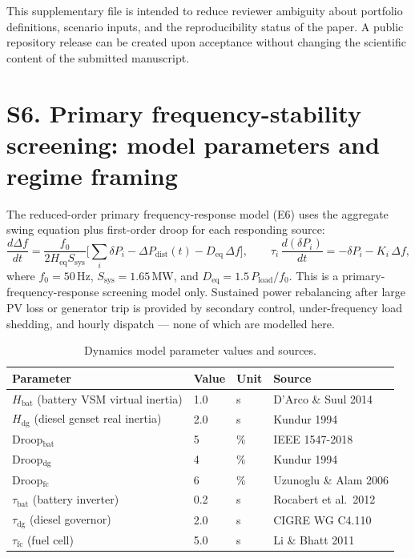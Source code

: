 \documentclass[11pt]{article}
\begin{document}
This supplementary file is intended to reduce reviewer ambiguity about portfolio definitions, scenario inputs, and the reproducibility status of the paper. A public repository release can be created upon acceptance without changing the scientific content of the submitted manuscript.

\section*{S6. Primary frequency-stability screening: model parameters and regime framing}

The reduced-order primary frequency-response model (E6) uses the aggregate swing equation plus first-order droop for each responding source:
\[
\frac{d\Delta f}{dt} = \frac{f_0}{2 H_\mathrm{eq} S_\mathrm{sys}}
\bigl[\textstyle\sum_i \delta P_i - \Delta P_\mathrm{dist}(t) - D_\mathrm{eq}\,\Delta f\bigr],
\qquad
\tau_i\,\frac{d(\delta P_i)}{dt} = -\delta P_i - K_i\,\Delta f,
\]
where $f_0 = 50$\,Hz, $S_\mathrm{sys} = 1.65$\,MW, and $D_\mathrm{eq} = 1.5\,P_\mathrm{load}/f_0$.
This is a primary-frequency-response screening model only.
Sustained power rebalancing after large PV loss or generator trip is provided by secondary control, under-frequency load shedding, and hourly dispatch --- none of which are modelled here.

\begin{table}[H]
\centering
\small
\caption{Dynamics model parameter values and sources.}
\label{tab:dynparams}
\begin{tabular}{llll}
\toprule
Parameter & Value & Unit & Source \\
\midrule
$H_\mathrm{bat}$ (battery VSM virtual inertia) & 1.0 & s & D'Arco \& Suul 2014 \\
$H_\mathrm{dg}$ (diesel genset real inertia) & 2.0 & s & Kundur 1994 \\
Droop$_\mathrm{bat}$ & 5 & \% & IEEE 1547-2018 \\
Droop$_\mathrm{dg}$ & 4 & \% & Kundur 1994 \\
Droop$_\mathrm{fc}$ & 6 & \% & Uzunoglu \& Alam 2006 \\
$\tau_\mathrm{bat}$ (battery inverter) & 0.2 & s & Rocabert et al.\ 2012 \\
$\tau_\mathrm{dg}$ (diesel governor) & 2.0 & s & CIGRE WG C4.110 \\
$\tau_\mathrm{fc}$ (fuel cell) & 5.0 & s & Li \& Bhatt 2011 \\
\bottomrule
\end{tabular}
\end{table}
\end{document}
